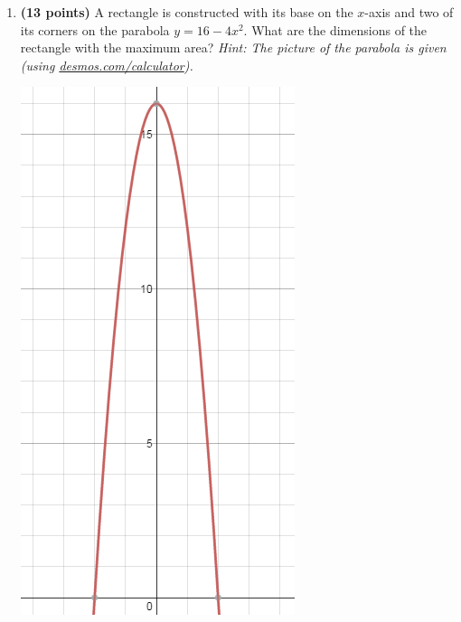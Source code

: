 \documentclass[12pt,letterpaper]{article}
\begin{document}
\begin{enumerate}[1.]
\newpage
\item {\bf (13 points)} A rectangle is constructed with its base on the $x$-axis and two of its corners on the parabola $y=16-4x^2$.  What are the dimensions of the rectangle with the maximum area?  {\it Hint: The picture of the parabola is given (using \url{desmos.com/calculator}).}

\vspace{2pc}
\includegraphics[scale=0.75]{exam3pic5}%




\end{enumerate}
\end{document}
